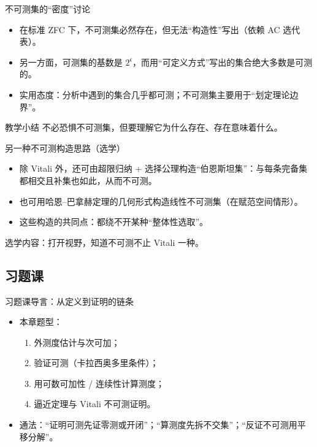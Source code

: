 \documentclass[aspectratio=169,11pt]{ctexbeamer}
\begin{document}
\begin{frame}{不可测集的“密度”讨论}
  \begin{itemize}
    \item 在标准 ZFC 下，不可测集\alert{必然存在}，但无法“构造性”写出（依赖 AC 选代表）。
    \item 另一方面，可测集的基数是 $2^{\mathfrak{c}}$，而用“可定义方式”写出的集合绝大多数是可测的。
    \item 实用态度：分析中遇到的集合几乎都可测；不可测集主要用于“划定理论边界”。
  \end{itemize}
  \begin{block}{教学小结}
    不必恐惧不可测集，但要理解它为什么存在、存在意味着什么。
  \end{block}
\end{frame}

\begin{frame}{另一种不可测构造思路（选学）}
  \begin{itemize}
    \item 除 Vitali 外，还可由\alert{超限归纳 + 选择公理}构造“伯恩斯坦集”：与每条完备集都相交且补集也如此，从而不可测。
    \item 也可用\alert{哈恩--巴拿赫定理}的几何形式构造线性不可测集（在赋范空间情形）。
    \item 这些构造的共同点：都绕不开某种“整体性选取”。
  \end{itemize}
  \begin{center}
    \color{cloudgray}\small 选学内容：打开视野，知道不可测不止 Vitali 一种。
  \end{center}
\end{frame}

\subsection{习题课}

\begin{frame}{习题课导言：从定义到证明的链条}
  \begin{itemize}
    \item 本章题型：
      \begin{enumerate}
        \item 外测度估计与次可加；
        \item 验证可测（卡拉西奥多里条件）；
        \item 用可数可加性 / 连续性计算测度；
        \item 逼近定理与 Vitali 不可测证明。
      \end{enumerate}
    \item 通法：\alert{“证明可测先证零测或开闭”；“算测度先拆不交集”；“反证不可测用平移分解”}。
  \end{itemize}
\end{frame}
\end{document}
